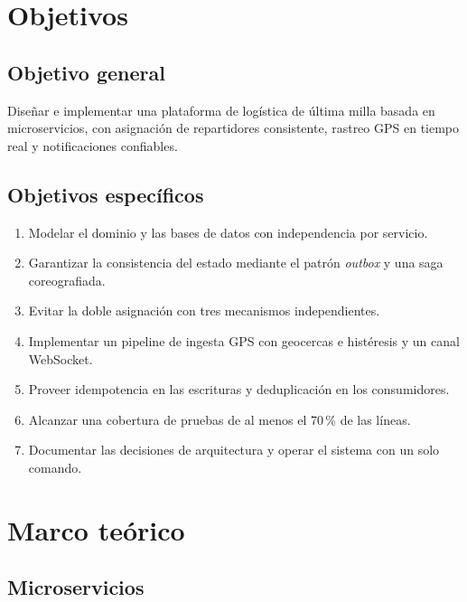 \documentclass[conference]{IEEEtran}
\begin{document}
\clearpage
\section{Objetivos}

\subsection{Objetivo general}

Diseñar e implementar una plataforma de logística de última milla basada en microservicios, con
asignación de repartidores consistente, rastreo GPS en tiempo real y notificaciones confiables.

\subsection{Objetivos específicos}

\begin{enumerate}[leftmargin=1.2cm]
  \item Modelar el dominio y las bases de datos con independencia por servicio.
  \item Garantizar la consistencia del estado mediante el patrón \emph{outbox} y una saga
        coreografiada.
  \item Evitar la doble asignación con tres mecanismos independientes.
  \item Implementar un pipeline de ingesta GPS con geocercas e histéresis y un canal WebSocket.
  \item Proveer idempotencia en las escrituras y deduplicación en los consumidores.
  \item Alcanzar una cobertura de pruebas de al menos el 70\,\% de las líneas.
  \item Documentar las decisiones de arquitectura y operar el sistema con un solo comando.
\end{enumerate}

\clearpage
\section{Marco teórico}

\subsection{Microservicios}
\end{document}
